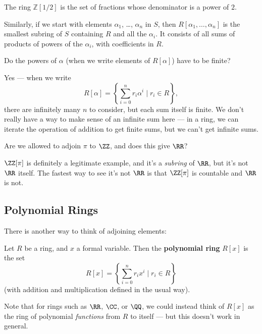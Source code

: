 \begin{example}
    The ring $\mathbb{Z}[1/2]$ is the set of fractions whose denominator is a power of $2$. 
\end{example}

Similarly, if we start with elements $\alpha_1$, \ldots, $\alpha_n$ in $S$, then $R[\alpha_1, \ldots, \alpha_n]$ is the smallest subring of $S$ containing $R$ and all the $\alpha_i$. It consists of all sums of products of powers of the $\alpha_i$, with coefficients in $R$. 

\begin{question}
Do the powers of $\alpha$ (when we write elements of $R[\alpha]$) have to be finite? 
\end{question}

\begin{ans}
Yes --- when we write \[R[\alpha] = \left\{\sum_{i = 0}^n r_i\alpha^i \mid r_i \in R\right\},\] there are infinitely many $n$ to consider, but each sum itself is finite. We don't really have a way to make sense of an infinite sum here --- in a ring, we can iterate the operation of addition to get finite sums, but we can't get infinite sums.
\end{ans}

\begin{question}
Are we allowed to adjoin $\pi$ to $\ZZ$, and does this give $\RR$?
\end{question}

\begin{ans}
$\ZZ[\pi]$ is definitely a legitimate example, and it's a \emph{subring} of $\RR$, but it's not $\RR$ itself. The fastest way to see it's not $\RR$ is that $\ZZ[\pi]$ is countable and $\RR$ is not. 
\end{ans}

\subsection{Polynomial Rings}

There is another way to think of adjoining elements:

\begin{definition}
    Let $R$ be a ring, and $x$ a formal variable. Then the \textbf{polynomial ring} $R[x]$ is the set \[R[x] = \left\{\sum_{i = 0}^n r_ix^i \mid r_i \in R\right\}\] (with addition and multiplication defined in the usual way).  
\end{definition}

Note that for rings such as $\RR$, $\CC$, or $\QQ$, we could instead think of $R[x]$ as the ring of polynomial \emph{functions} from $R$ to itself --- but this doesn't work in general. 

